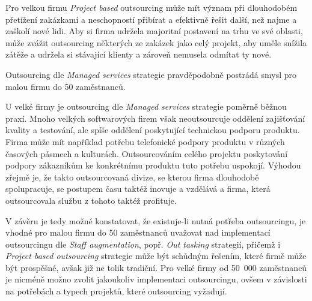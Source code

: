 \documentclass[a4paper,12pt]{article}
\begin{document}
    Pro velkou firmu \textit{Project based} outsourcing může mít význam při dlouhodobém přetížení zakázkami a neschopností přibírat a efektivně řešit další, než najme a zaškolí nové lidi. Aby si firma udržela majoritní postavení na trhu ve své oblasti, může zvážit outsourcing některých ze zakázek jako celý projekt, aby uměle snížila zátěže a udržela si stávající klienty a zároveň nemusela odmítat ty nové.

    Outsourcing dle \textit{Managed services} strategie pravděpodobně postrádá smysl pro malou firmu do 50 zaměstnanců.

    U velké firmy je outsourcing dle \textit{Managed services} strategie poměrně běžnou praxí. Mnoho velkých softwarových firem však neoutsourcuje oddělení zajišťování kvality a testování, ale spíše oddělení poskytující technickou podporu produktu. Firma může mít například potřebu telefonické podpory produktu v různých časových pásmech a kulturách. Outsourcováním celého projektu poskytování podpory zákazníkům ke konkrétnímu produktu tuto potřebu uspokojí. Výhodou zřejmě je, že takto outsourcovaná divize, se kterou firma dlouhodobě spolupracuje, se postupem času taktéž inovuje a vzdělává a firma, která outsourcovala službu z tohoto taktéž profituje.

    V závěru je tedy možné konstatovat, že existuje-li nutná potřeba outsourcingu, je vhodné pro malou firmu do 50 zaměstnanců uvažovat nad implementací outsourcingu dle \textit{Staff augmentation}, popř. \textit{Out tasking} strategií, přičemž i \textit{Project based outsourcing} strategie může být schůdným řešením, které firmě může být prospěšné, avšak již ne tolik tradiční. Pro velké firmy od 50~000 zaměstnanců je nicméně možno zvolit jakoukoliv implementaci outsourcingu, ovšem v závislosti na potřebách a typech projektů, které outsourcing vyžadují.
\end{document}
